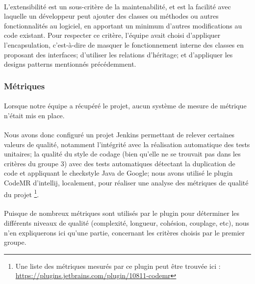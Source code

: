     \paragraph{}
    L'extensibilité est un sous-critère de la maintenabilité, et est la facilité avec laquelle un développeur peut ajouter des classes ou méthodes ou autres fonctionnalités au logiciel, en apportant un minimum d'autres modifications au code existant. Pour respecter ce critère, l'équipe avait choisi d'appliquer l'encapsulation, c'est-à-dire de masquer le fonctionnement interne des classes en proposant des interfaces; d'utiliser les relations d'héritage; et d'appliquer les designs patterns mentionnés précédemment. 

    \subsubsection{Métriques}
        \paragraph{}
        Lorsque notre équipe a récupéré le projet, aucun système de mesure de métrique n'était mis en place. 
        \paragraph{}
        Nous avons donc configuré un projet Jenkins permettant de relever certaines valeurs de qualité, notamment l'intégrité avec la réalisation automatique des tests unitaires; la qualité du style de codage (bien qu'elle ne se trouvait pas dans les critères du groupe 3) avec des tests automatiques détectant la duplication de code et appliquant le checkstyle Java de Google; nous avons utilisé le plugin CodeMR d'intellij, localement, pour réaliser une analyse des métriques de qualité du projet \footnote{Une liste des métriques mesurés par ce plugin peut être trouvée ici : \url{https://plugins.jetbrains.com/plugin/10811-codemr}}. 
        \paragraph{}
        Puisque de nombreux métriques sont utilisés par le plugin pour déterminer les différents niveaux de qualité (complexité, longueur, cohésion, couplage, etc), nous n'en expliquerons ici qu'une partie, concernant les critères choisis par le premier groupe.  
